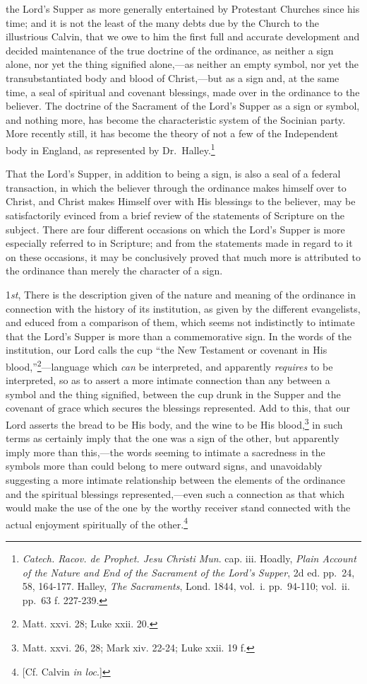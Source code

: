 \documentclass[english,]{book}
\begin{document}
the Lord's Supper as more generally entertained by Protestant Churches since his time; and it is not the least of the many debts due by the Church to the illustrious Calvin, that we owe to him the first full and accurate development and decided maintenance of the true doctrine of the ordinance, as neither a sign alone, nor yet the thing signified alone,---as neither an empty symbol, nor yet the transubstantiated body and blood of Christ,---but as a sign and, at the same time, a seal of spiritual and covenant blessings, made over in the ordinance to the believer. The doctrine of the Sacrament of the Lord's Supper as a sign or symbol, and nothing more, has become the characteristic system of the Socinian party. More recently still, it has become the theory of not a few of the Independent body in England, as represented by Dr.~Halley.\footnote{\emph{Catech. Racov. de Prophet. Jesu Christi Mun}. cap. iii. Hoadly, \emph{Plain Account of the Nature and End of the Sacrament of the Lord's Supper}, 2d ed. pp.~24, 58, 164-177. Halley, \emph{The Sacraments}, Lond. 1844, vol.~i. pp.~94-110; vol.~ii. pp.~63 f. 227-239.}

That the Lord's Supper, in addition to being a sign, is also a seal of a federal transaction, in which the believer through the ordinance makes himself over to Christ, and Christ makes Himself over with His blessings to the believer, may be satisfactorily evinced from a brief review of the statements of Scripture on the subject. There are four different occasions on which the Lord's Supper is more especially referred to in Scripture; and from the statements made in regard to it on these occasions, it may be conclusively proved that much more is attributed to the ordinance than merely the character of a sign.

1\emph{st}, There is the description given of the nature and meaning of the ordinance in connection with the history of its institution, as given by the different evangelists, and educed from a comparison of them, which seems not indistinctly to intimate that the Lord's Supper is more than a commemorative sign. In the words of the institution, our Lord calls the cup ``the New Testament or covenant in His blood,''\footnote{Matt. xxvi. 28; Luke xxii. 20.}---language which \emph{can} be interpreted, and apparently \emph{requires} to be interpreted, so as to assert a more intimate connection than any between a symbol and the thing signified, between the cup drunk in the Supper and the covenant of grace which secures the blessings represented. Add to this, that our Lord asserts the bread to be His body, and the wine to be His blood,\footnote{Matt. xxvi. 26, 28; Mark xiv. 22-24; Luke xxii. 19 f.} in such terms as certainly imply that the one was a sign of the other, but apparently imply more than this,---the words seeming to intimate a sacredness in the symbols more than could belong to mere outward signs, and unavoidably suggesting a more intimate relationship between the elements of the ordinance and the spiritual blessings represented,---even such a connection as that which would make the use of the one by the worthy receiver stand connected with the actual enjoyment spiritually of the other.\footnote{{[}Cf. Calvin \emph{in loc}.{]}}
\end{document}
